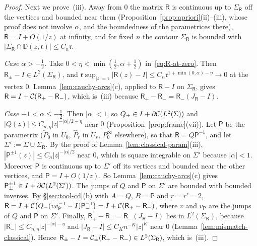 \begin{proof}
Next we prove~(iii). Away from $0$ the matrix $\mathsf R$ is continuous up to $\Sigma_{\mathsf R}$ off the vertices and
bounded near them (Proposition~\ref{prop:apriori}(ii)--(iii), whose proof does not involve $\alpha$, and the boundedness
of the parametrices there), $\mathsf R=I+O(1/z)$ at infinity, and for fixed $n$ the contour $\Sigma_{\mathsf R}$ is
bounded with $|\Sigma_{\mathsf R}\cap\mathbb D(z,\mathfrak r)|\le C_n\mathfrak r$.

\emph{Case $\alpha>-\frac12$.} Take $0<\eta<\min(\frac12,\alpha+\frac12)$ in~\eqref{eq:R-at-zero}. Then
$\mathsf R_\pm-I\in L^2(\Sigma_{\mathsf R})$, and $\mathfrak r\sup_{|z|=\mathfrak r}|\mathsf R(z)-I|\le
C_n\mathfrak r^{1+\min(0,\alpha)-\eta}\to0$ at the vertex $0$. Lemma~\ref{lem:cauchy-arcs}(c), applied to $\mathsf R-I$ on
$\Sigma_{\mathsf R}$, gives $\mathsf R=I+\mathcal{C}(\mathsf R_+-\mathsf R_-)$, which is~(iii) because
$\mathsf R_+-\mathsf R_-=\mathsf R_-(J_{\mathsf R}-I)$.

\emph{Case $-1<\alpha\le-\frac12$.} Then $|\alpha|<1$, so $Q_\pm\in I+\partial\mathcal{C}(L^2(\Sigma))$ and
$|Q(z)|\le C_{n,\eta}|z|^{-|\alpha|/2-\eta}$ near $0$ (Proposition~\ref{prop:frame}(vii)). Let $\mathsf P$ be the
parametrix ($\check P_0$ in $U_0$, $\hat P_r$ in $U_r$, $P^\infty_0$ elsewhere), so that $\mathsf R=Q\mathsf P^{-1}$, and
let $\Sigma':=\Sigma\cup\Sigma_{\mathsf R}$. By the proof of Lemma~\ref{lem:classical-param}(iii),
$|\mathsf P^{\pm1}(z)|\le C_n|z|^{-|\alpha|/2}$ near $0$, which is square integrable on $\Sigma'$ because $|\alpha|<1$.
Moreover $\mathsf P$ is continuous up to $\Sigma'$ off its vertices and bounded near the other vertices, and
$\mathsf P=I+O(1/z)$. So Lemma~\ref{lem:cauchy-arcs}(c) gives $\mathsf P_\pm^{\pm1}\in I+\partial\mathcal{C}(L^2(\Sigma'))$. The jumps of
$Q$ and $\mathsf P$ on $\Sigma'$ are bounded with bounded inverses. By \S\ref{sec:tool-cd}(b) with $A=Q$, $B=\mathsf P$
and $r=r'=2$, $\mathsf R=I+\mathcal{C}\bigl(Q_-(vv_{\mathsf P}^{-1}-I)\mathsf P_-^{-1}\bigr)=I+\mathcal{C}(\mathsf R_+-\mathsf R_-)$,
where $v$ and $v_{\mathsf P}$ are the jumps of $Q$ and $\mathsf P$ on $\Sigma'$. Finally,
$\mathsf R_+-\mathsf R_-=\mathsf R_-(J_{\mathsf R}-I)$ lies in $L^2(\Sigma_{\mathsf R})$, because
$|\mathsf R_-|\le C_{n,\eta}|z|^{-|\alpha|-\eta}$ and $|J_{\mathsf R}-I|\le C_Kn^{-K}|z|^K$ near $0$
(Lemma~\ref{lem:mismatch-classical}). Hence $\mathsf R_\pm-I=\mathcal{C}_\pm(\mathsf R_+-\mathsf R_-)\in L^2(\Sigma_{\mathsf R})$,
which is~(iii).


\end{proof}
